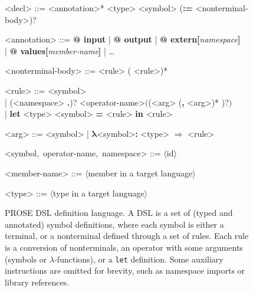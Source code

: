 \begin{figure}[t]
    \centering
    \renewcommand{\synt}[1]{\textsl{#1}}
    \renewcommand{\syntleft}{\slshape}
    \renewcommand{\syntright}{}
    \begin{mdframed}
    \begin{grammar}
        <decl> ::= <annotation>* <type> <symbol> (\textbf{:=} <nonterminal-body>)? \pmb{;}

        <annotation> ::= \textbf{@ input} | \textbf{@ output} | \textbf{@ extern[}\synt{namespace}\textbf{]} \\
        | \textbf{@ values[}\synt{member-name}\textbf{]} | \dots

        <nonterminal-body> ::= <rule> (\pmb{|} <rule>)*

        <rule> ::= <symbol> \\
        | (<namespace> \textbf{.})? <operator-name>$\pmb{\bigl(}$(<arg> (\textbf{,} <arg>)* )?$\pmb{\bigr)}$ \\
        | \textbf{let} <type> <symbol> \textbf{=} <rule> \textbf{in} <rule>

        <arg> ::= <symbol> | $\bm{\lambda}$<symbol>\textbf{:} <type> $\bm{\Rightarrow}$ <rule>

        <symbol,~operator-name,~namespace> ::= $\langle$\textup{id}$\rangle$

        <member-name> ::= $\langle$\textup{member in a target language}$\rangle$

        <type> ::=  $\langle$\textup{type in a target language}$\rangle$
    \end{grammar}
    \end{mdframed}
    \caption{PROSE DSL definition language. A DSL is a set of (typed and annotated) symbol definitions, where each
        symbol is either a terminal, or a nonterminal defined through a set of rules. Each rule is a conversion of
        nonterminals, an operator with some arguments (symbols or $\lambda$-functions), or a \texttt{let} definition.
        Some auxiliary instructions are omitted for brevity, such as namespace imports or library references.}
    \label{fig:dsldefinition}
\end{figure}
